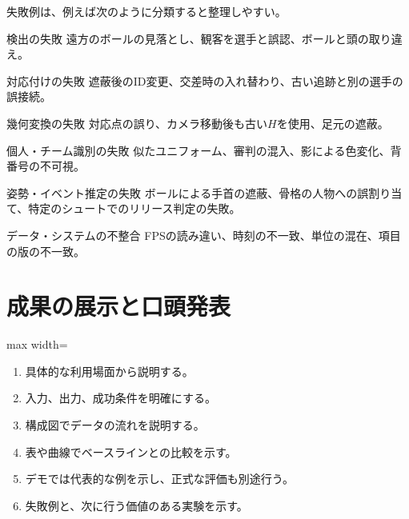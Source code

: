 \documentclass[11pt,a4paper,oneside]{report}
\begin{document}
失敗例は、例えば次のように分類すると整理しやすい。

\begin{tcbraster}[raster columns=2,raster equal height=rows,raster column skip=7pt,raster row skip=7pt]
\begin{termBox}{検出の失敗}
遠方のボールの見落とし、観客を選手と誤認、ボールと頭の取り違え。
\end{termBox}
\begin{termBox}{対応付けの失敗}
遮蔽後のID変更、交差時の入れ替わり、古い追跡と別の選手の誤接続。
\end{termBox}
\begin{termBox}{幾何変換の失敗}
対応点の誤り、カメラ移動後も古い$H$を使用、足元の遮蔽。
\end{termBox}
\begin{termBox}{個人・チーム識別の失敗}
似たユニフォーム、審判の混入、影による色変化、背番号の不可視。
\end{termBox}
\begin{termBox}{姿勢・イベント推定の失敗}
ボールによる手首の遮蔽、骨格の人物への誤割り当て、特定のシュートでのリリース判定の失敗。
\end{termBox}
\begin{termBox}{データ・システムの不整合}
FPSの読み違い、時刻の不一致、単位の混在、項目の版の不一致。
\end{termBox}
\end{tcbraster}

\section{成果の展示と口頭発表}

\begin{center}
\begin{adjustbox}{max width=\linewidth}
\end{adjustbox}
\end{center}

\begin{enumerate}
  \item 具体的な利用場面から説明する。
  \item 入力、出力、成功条件を明確にする。
  \item 構成図でデータの流れを説明する。
  \item 表や曲線でベースラインとの比較を示す。
  \item デモでは代表的な例を示し、正式な評価も別途行う。
  \item 失敗例と、次に行う価値のある実験を示す。
\end{enumerate}
\end{document}
